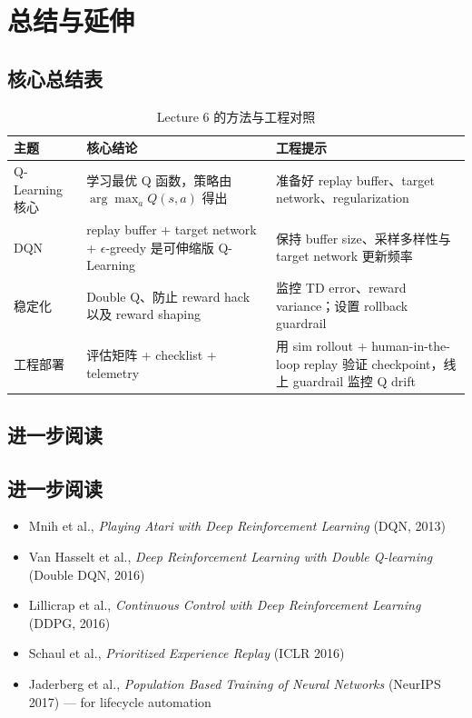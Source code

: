 \section{总结与延伸}

\subsection{核心总结表}

\begin{table}[H]
\centering
\begin{tabular}{p{} p{} p{}}
\toprule
主题 & 核心结论 & 工程提示 \\
\midrule
Q-Learning 核心 & 学习最优 Q 函数，策略由 $\arg\max_a Q(s,a)$ 得出 & 准备好 replay buffer、target network、regularization \\
DQN & replay buffer + target network + $\epsilon$-greedy 是可伸缩版 Q-Learning & 保持 buffer size、采样多样性与 target network 更新频率 \\
稳定化 & Double Q、防止 reward hack 以及 reward shaping & 监控 TD error、reward variance；设置 rollback guardrail \\
工程部署 & 评估矩阵 + checklist + telemetry & 用 sim rollout + human-in-the-loop replay 验证 checkpoint，线上 guardrail 监控 Q drift \\
\bottomrule
\end{tabular}
\caption{Lecture 6 的方法与工程对照}
\end{table}

\subsection{进一步阅读}
\subsection{进一步阅读}

\begin{itemize}
    \item Mnih et al., \textit{Playing Atari with Deep Reinforcement Learning} (DQN, 2013)
    \item Van Hasselt et al., \textit{Deep Reinforcement Learning with Double Q-learning} (Double DQN, 2016)
    \item Lillicrap et al., \textit{Continuous Control with Deep Reinforcement Learning} (DDPG, 2016)
    \item Schaul et al., \textit{Prioritized Experience Replay} (ICLR 2016)
    \item Jaderberg et al., \textit{Population Based Training of Neural Networks} (NeurIPS 2017) — for lifecycle automation
\end{itemize}

